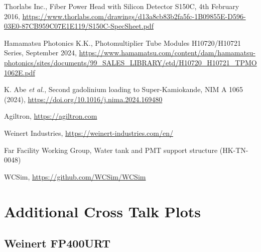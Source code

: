 \documentclass[a4paper,11pt]{article}
\begin{document}
\begin{thebibliography}{99}
Thorlabs Inc., Fiber Power Head with Silicon Detector S150C, 4th February 2016, \url{https://www.thorlabs.com/drawings/d13a8cb83b2fa5fc-1B09855E-D596-03E0-87CB959C07E1E119/S150C-SpecSheet.pdf}

Hamamatsu Photonics K.K., Photomultiplier Tube Modules H10720/H10721 Series, September 2024, \url{https://www.hamamatsu.com/content/dam/hamamatsu-photonics/sites/documents/99_SALES_LIBRARY/etd/H10720_H10721_TPMO1062E.pdf}

K. Abe {\it et al.}, Second gadolinium loading to Super-Kamiokande, NIM A 1065 (2024), \url{https://doi.org/10.1016/j.nima.2024.169480}


Agiltron, \url{https://agiltron.com}

Weinert Industries, \url{https://weinert-industries.com/en/}


Far Facility Working Group, Water tank and PMT support structure (HK-TN-0048)


WCSim, \url{https://github.com/WCSim/WCSim}

\end{thebibliography}

\clearpage
\newpage
\appendix

\section{Additional Cross Talk Plots}\label{app:crosstalk}

\subsection{Weinert FP400URT}
\end{document}
